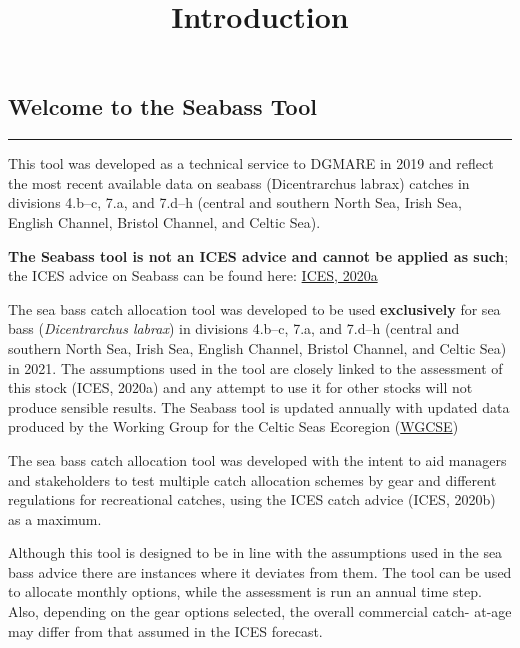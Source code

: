 \documentclass[
]{article}
\title{Introduction}
\author{}
\date{\vspace{-2.5em}}
\begin{document}
\maketitle

\hypertarget{welcome-to-the-seabass-tool}{%
\subsection{Welcome to the Seabass
Tool}\label{welcome-to-the-seabass-tool}}

\begin{center}\rule{0.5\linewidth}{0.5pt}\end{center}

This tool was developed as a technical service to DGMARE in 2019 and
reflect the most recent available data on seabass (Dicentrarchus labrax)
catches in divisions 4.b--c, 7.a, and 7.d--h (central and southern North
Sea, Irish Sea, English Channel, Bristol Channel, and Celtic Sea).

\textbf{The Seabass tool is not an ICES advice and cannot be applied as
such}; the ICES advice on Seabass can be found here:
\href{http://ices.dk/sites/pub/Publication\%20Reports/Advice/2020/2020/bss.27.4bc7ad-h.pdf}{ICES,
2020a}

The sea bass catch allocation tool was developed to be used
\textbf{exclusively} for sea bass (\emph{Dicentrarchus labrax}) in
divisions 4.b--c, 7.a, and 7.d--h (central and southern North Sea, Irish
Sea, English Channel, Bristol Channel, and Celtic Sea) in 2021. The
assumptions used in the tool are closely linked to the assessment of
this stock (ICES, 2020a) and any attempt to use it for other stocks will
not produce sensible results. The Seabass tool is updated annually with
updated data produced by the Working Group for the Celtic Seas Ecoregion
(\href{https://www.ices.dk/community/groups/Pages/WGCSE.aspx}{WGCSE})

The sea bass catch allocation tool was developed with the intent to aid
managers and stakeholders to test multiple catch allocation schemes by
gear and different regulations for recreational catches, using the ICES
catch advice (ICES, 2020b) as a maximum.

Although this tool is designed to be in line with the assumptions used
in the sea bass advice there are instances where it deviates from them.
The tool can be used to allocate monthly options, while the assessment
is run an annual time step. Also, depending on the gear options
selected, the overall commercial catch- at-age may differ from that
assumed in the ICES forecast.
\end{document}
